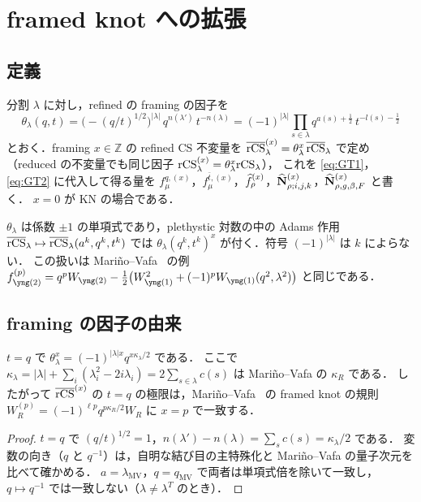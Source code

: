 \section{framed knot への拡張}\label{sec:framing}

\subsection{定義}
\begin{definition}\label{def:framed}
分割 $\lambda$ に対し，refined の framing の因子を
\[
\theta_\lambda(q,t)=\bigl(-(q/t)^{1/2}\bigr)^{|\lambda|}\,q^{n(\lambda')}\,t^{-n(\lambda)}
=(-1)^{|\lambda|}\prod_{s\in\lambda}q^{a(s)+\frac12}\,t^{-l(s)-\frac12}
\]
とおく．framing $x\in\mathbb{Z}$ の refined CS 不変量を $\overline{\textrm{rCS}}^{(x)}_\lambda=\theta_\lambda^x\,\overline{\textrm{rCS}}_\lambda$ で定め（reduced の不変量でも同じ因子 $\textrm{rCS}^{(x)}_\lambda=\theta_\lambda^x\textrm{rCS}_\lambda$），
これを \eqref{eq:GT1}，\eqref{eq:GT2} に代入して得る量を $f^{q,(x)}_\mu$，$f^{\bar t,(x)}_\mu$，$\widehat{f}^{(x)}_\rho$，$\widehat{\mathbf{N}}^{(x)}_{\rho;i,j,k}$，$\widehat{\mathbf{N}}^{(x)}_{\rho,g,\beta,F}$ と書く．
$x=0$ が KN の場合である．
\end{definition}

$\theta_\lambda$ は係数 $\pm1$ の単項式であり，plethystic 対数の中の Adams 作用 $\overline{\textrm{rCS}}_\lambda\mapsto\overline{\textrm{rCS}}_\lambda(a^k,q^k,t^k)$ では
$\theta_\lambda(q^k,t^k)^x$ が付く．符号 $(-1)^{|\lambda|}$ は $k$ によらない．
この扱いは Mariño--Vafa~\cite{Marino01} の例
$f^{(p)}_{\yng(2)}=q^pW_{\yng(2)}-\tfrac12\bigl(W_{\yng(1)}^2+(-1)^pW_{\yng(1)}(q^2,\lambda^2)\bigr)$ と同じである．

\subsection{framing の因子の由来}
\begin{proposition}\label{prop:MV}
$t=q$ で $\theta_\lambda^x=(-1)^{|\lambda|x}q^{x\kappa_\lambda/2}$ である．
ここで $\kappa_\lambda=|\lambda|+\sum_i(\lambda_i^2-2i\lambda_i)=2\sum_{s\in\lambda}c(s)$ は Mariño--Vafa の $\kappa_R$ である．
したがって $\overline{\textrm{rCS}}^{(x)}$ の $t=q$ の極限は，Mariño--Vafa~\cite{Marino01} の framed knot の規則 $W^{(p)}_R=(-1)^{\ell p}q^{p\kappa_R/2}W_R$ に $x=p$ で一致する．
\end{proposition}
\begin{proof}
$t=q$ で $(q/t)^{1/2}=1$，$n(\lambda')-n(\lambda)=\sum_s c(s)=\kappa_\lambda/2$ である．
変数の向き（$q$ と $q^{-1}$）は，自明な結び目の主特殊化と Mariño--Vafa の量子次元を比べて確かめる．
$a=\lambda_{\mathrm{MV}}$，$q=q_{\mathrm{MV}}$ で両者は単項式倍を除いて一致し，$q\mapsto q^{-1}$ では一致しない（$\lambda\neq\lambda^T$ のとき）．
\end{proof}

